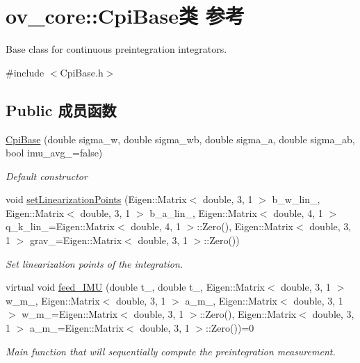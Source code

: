 \hypertarget{classov__core_1_1CpiBase}{}\section{ov\+\_\+core\+:\+:Cpi\+Base类 参考}
\label{classov__core_1_1CpiBase}


Base class for continuous preintegration integrators.  




{\ttfamily \#include $<$Cpi\+Base.\+h$>$}

\subsection*{Public 成员函数}
\begin{DoxyCompactItemize}
\item 
\hyperlink{classov__core_1_1CpiBase_a362f384da35801365d15d53dfe7d3116}{Cpi\+Base} (double sigma\+\_\+w, double sigma\+\_\+wb, double sigma\+\_\+a, double sigma\+\_\+ab, bool imu\+\_\+avg\+\_\+=false)
\begin{DoxyCompactList}\small\item\em Default constructor \end{DoxyCompactList}\item 
void \hyperlink{classov__core_1_1CpiBase_a32c11e3e61dc8a524bf48a18504b5417}{set\+Linearization\+Points} (Eigen\+::\+Matrix$<$ double, 3, 1 $>$ b\+\_\+w\+\_\+lin\+\_\+, Eigen\+::\+Matrix$<$ double, 3, 1 $>$ b\+\_\+a\+\_\+lin\+\_\+, Eigen\+::\+Matrix$<$ double, 4, 1 $>$ q\+\_\+k\+\_\+lin\+\_\+=Eigen\+::\+Matrix$<$ double, 4, 1 $>$\+::Zero(), Eigen\+::\+Matrix$<$ double, 3, 1 $>$ grav\+\_\+=Eigen\+::\+Matrix$<$ double, 3, 1 $>$\+::Zero())
\begin{DoxyCompactList}\small\item\em Set linearization points of the integration. \end{DoxyCompactList}\item 
virtual void \hyperlink{classov__core_1_1CpiBase_af3b192b968d702b484a672a5557bea13}{feed\+\_\+\+I\+MU} (double t\+\_, double t\+\_, Eigen\+::\+Matrix$<$ double, 3, 1 $>$ w\+\_\+m\+\_, Eigen\+::\+Matrix$<$ double, 3, 1 $>$ a\+\_\+m\+\_, Eigen\+::\+Matrix$<$ double, 3, 1 $>$ w\+\_\+m\+\_=Eigen\+::\+Matrix$<$ double, 3, 1 $>$\+::Zero(), Eigen\+::\+Matrix$<$ double, 3, 1 $>$ a\+\_\+m\+\_=Eigen\+::\+Matrix$<$ double, 3, 1 $>$\+::Zero())=0
\begin{DoxyCompactList}\small\item\em Main function that will sequentially compute the preintegration measurement. \end{DoxyCompactList}\end{DoxyCompactItemize}
